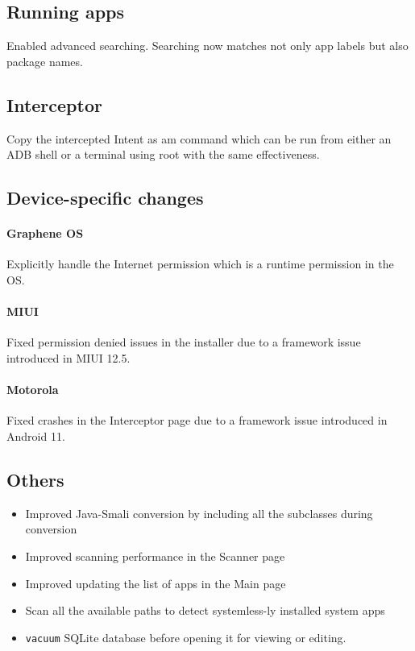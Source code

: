 \subsection{Running apps}
Enabled advanced searching. Searching now matches not only app labels but also package names.

\subsection{Interceptor}
Copy the intercepted Intent as am command which can be run from either an ADB shell or a terminal using root with the same effectiveness.

\subsection{Device-specific changes}
\paragraph{Graphene OS} Explicitly handle the Internet permission which is a runtime permission in the OS.
\paragraph{MIUI} Fixed permission denied issues in the installer due to a framework issue introduced in MIUI 12.5.
\paragraph{Motorola} Fixed crashes in the Interceptor page due to a framework issue introduced in Android 11.

\subsection{Others}
\begin{itemize}
    \item Improved Java-Smali conversion by including all the subclasses during conversion
    \item Improved scanning performance in the Scanner page
    \item Improved updating the list of apps in the Main page
    \item Scan all the available paths to detect systemless-ly installed system apps
    \item \texttt{vacuum} SQLite database before opening it for viewing or editing.
\end{itemize}

